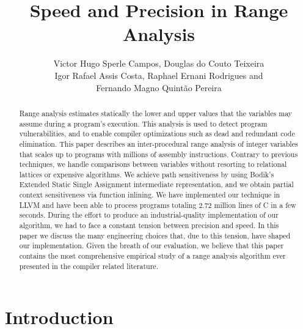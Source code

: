\documentclass[times]{speauth}
\begin{document}

\title{Speed and Precision in Range Analysis}

\author{Victor Hugo Sperle Campos, Douglas do Couto Teixeira \\
Igor Rafael Assis Costa, Raphael Ernani Rodrigues and\\
Fernando Magno Quint\~{a}o Pereira\corrauth}

\address{UFMG -- 6627 Ant\^{o}nio Carlos Av, 31.270-010, Belo Horizonte, Brazil}


\begin{abstract}
Range analysis estimates statically the lower and upper values that
the variables may assume during a program's execution.
This analysis is used to detect program vulnerabilities, and to enable compiler
optimizations such as dead and redundant code elimination.
This paper describes an inter-procedural range analysis of integer variables that
scales up to programs with millions of assembly instructions.
Contrary to previous techniques, we handle comparisons between variables
without resorting to relational lattices or expensive algorithms.
We achieve path sensitiveness by using Bodik's Extended Static Single
Assignment intermediate representation, and we obtain partial
context sensitiveness via function inlining.
We have implemented our technique in LLVM and have been able to process
programs totaling 2.72 million lines of C in a few seconds.
During the effort to produce an industrial-quality implementation of our
algorithm, we had to face a constant tension between precision and speed.
In this paper we discuss the many engineering choices that, due to this tension,
have shaped our implementation.
Given the breath of our evaluation, we believe that this paper contains the most
comprehensive empirical study of a range analysis algorithm ever presented in the
compiler related literature.
\end{abstract}

\maketitle

\section{Introduction}
\end{document}
